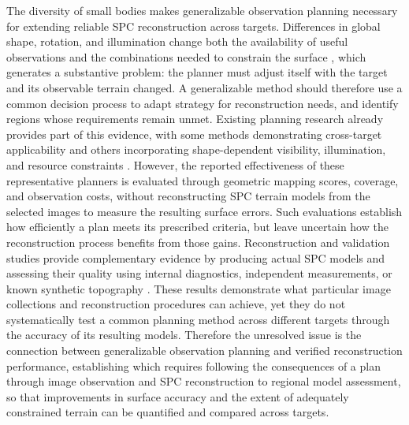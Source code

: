 The diversity of small bodies makes generalizable observation planning necessary for extending reliable SPC reconstruction across targets. Differences in global shape, rotation, and illumination change both the availability of useful observations and the combinations needed to constrain the surface \citep{palmer2022}, which generates a substantive problem: the planner must adjust itself with the target and its observable terrain changed. A generalizable method should therefore use a common decision process to adapt strategy for reconstruction needs, and identify regions whose requirements remain unmet. Existing planning research already provides part of this evidence, with some methods demonstrating cross-target applicability and others incorporating shape-dependent visibility, illumination, and resource constraints \citep{piccinin2022,wang2025}. However, the reported effectiveness of these representative planners is evaluated through geometric mapping scores, coverage, and observation costs, without reconstructing SPC terrain models from the selected images to measure the resulting surface errors. Such evaluations establish how efficiently a plan meets its prescribed criteria, but leave uncertain how the reconstruction process benefits from those gains. Reconstruction and validation studies provide complementary evidence by producing actual SPC models and assessing their quality using internal diagnostics, independent measurements, or known synthetic topography \citep{alasad2021,weirich2022,ernst2023}. These results demonstrate what particular image collections and reconstruction procedures can achieve, yet they do not systematically test a common planning method across different targets through the accuracy of its resulting models. Therefore the unresolved issue is the connection between generalizable observation planning and verified reconstruction performance, establishing which requires following the consequences of a plan through image observation and SPC reconstruction to regional model assessment, so that improvements in surface accuracy and the extent of adequately constrained terrain can be quantified and compared across targets. 

